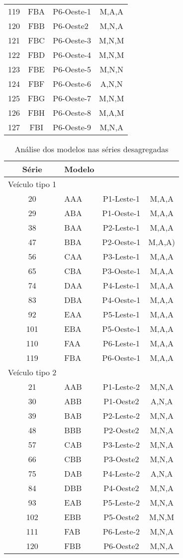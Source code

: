 \documentclass[
	12pt,				%
	openright,			%
	twoside,			%
	a4paper,			%
	english,			%
	french,				%
	spanish,			%
	brazil				%
	]{abntex2}
\begin{document}
\begin{apendicesenv}
\begin{longtable} {| c c l c |}
119 & FBA & P6-Oeste-1 & M,A,A\\
120 & FBB & P6-Oeste2 & M,N,A\\
121 & FBC & P6-Oeste-3 & M,N,M\\
122 & FBD & P6-Oeste-4 & M,N,M\\
123 & FBE & P6-Oeste-5 & M,N,N\\
124 & FBF & P6-Oeste-6 & A,N,N\\
125 & FBG & P6-Oeste-7 & M,N,M\\
126 & FBH & P6-Oeste-8 & M,A,M\\
127 & FBI & P6-Oeste-9 & M,N,A\\

\end{longtable}


\begin{table}[h]
\ABNTEXfontereduzida\caption{Análise dos modelos nas séries desagregadas}
\label{tab:modelos-bottom}
\begin{tabular}{c l c c}

\toprule

Série & Modelo  \\
\midrule
Veículo tipo 1 & \\
20 & AAA & P1-Leste-1 & M,A,A\\
29 & ABA & P1-Oeste-1 & M,A,A\\
38 & BAA & P2-Leste-1 & M,A,A\\
47 & BBA & P2-Oeste-1 & M,A,A)\\
56 & CAA & P3-Leste-1 & M,A,A\\
65 & CBA & P3-Oeste-1 & M,A,A\\
74 & DAA & P4-Leste-1 & M,A,A\\
83 & DBA & P4-Oeste-1 & M,A,A\\
92 & EAA & P5-Leste-1 & M,A,A\\
101 & EBA & P5-Oeste-1 & M,A,A\\
110 & FAA & P6-Leste-1 & M,A,A\\
119 & FBA & P6-Oeste-1 & M,A,A\\

\hline
Veículo tipo 2 & \\
\hline

21 & AAB & P1-Leste-2 & M,N,A\\
30 & ABB & P1-Oeste2 & A,N,A\\
39 & BAB & P2-Leste-2 & M,N,A\\
48 & BBB & P2-Oeste2 & M,N,A\\
57 & CAB & P3-Leste-2 & M,N,A\\
66 & CBB & P3-Oeste2 & M,N,A\\
75 & DAB & P4-Leste-2 & A,N,A\\
84 & DBB & P4-Oeste2 & M,N,A\\
93 & EAB & P5-Leste-2 & M,N,A\\
102 & EBB & P5-Oeste2 & M,N,M\\
111 & FAB & P6-Leste-2 & M,N,A\\
120 & FBB & P6-Oeste2 & M,N,A\\


\end{tabular}
\end{table}
\end{apendicesenv}
\end{document}
